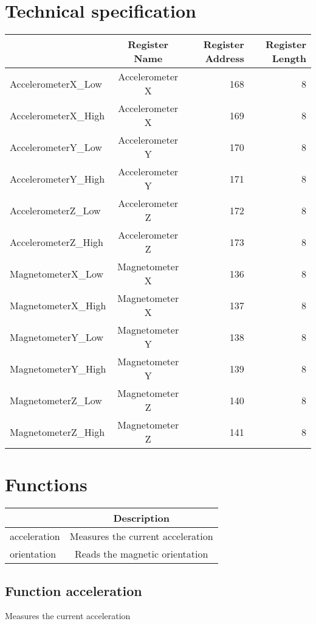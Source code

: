 \documentclass[a4paper,12pt,oneside,pdflatex,italian,final,twocolumn]{article}
\begin{document}
\section{Technical specification}
\centering
\begin{tabular}{lcrr}
\toprule
 & Register Name & Register Address & Register Length \\
\midrule
AccelerometerX\_Low & Accelerometer X & 168 & 8 \\
AccelerometerX\_High & Accelerometer X & 169 & 8 \\
AccelerometerY\_Low & Accelerometer Y & 170 & 8 \\
AccelerometerY\_High & Accelerometer Y & 171 & 8 \\
AccelerometerZ\_Low & Accelerometer Z & 172 & 8 \\
AccelerometerZ\_High & Accelerometer Z & 173 & 8 \\
MagnetometerX\_Low & Magnetometer X & 136 & 8 \\
MagnetometerX\_High & Magnetometer X & 137 & 8 \\
MagnetometerY\_Low & Magnetometer Y & 138 & 8 \\
MagnetometerY\_High & Magnetometer Y & 139 & 8 \\
MagnetometerZ\_Low & Magnetometer Z & 140 & 8 \\
MagnetometerZ\_High & Magnetometer Z & 141 & 8 \\
\bottomrule
\end{tabular}


\raggedright

\section{Functions}

\centering
\begin{tabular}{lc}
\toprule
  & Description \\
\midrule
acceleration & Measures the current acceleration \\
orientation & Reads the magnetic orientation \\
\bottomrule
\end{tabular}


\raggedright
\subsection{Function acceleration }
Measures the current acceleration \\
\end{document}
